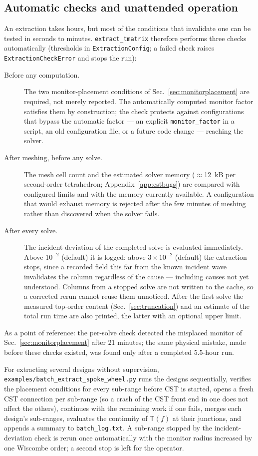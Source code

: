 \documentclass[11pt]{article}
\begin{document}
\subsection{Automatic checks and unattended operation}
\label{sec:rungates}
An extraction takes hours, but most of the conditions that invalidate
one can be tested in seconds to minutes.  \texttt{extract\_tmatrix}
therefore performs three checks automatically (thresholds in
\texttt{ExtractionConfig}; a failed check raises
\texttt{ExtractionCheckError} and stops the run):
\begin{description}
\item[Before any computation.]  The two monitor-placement conditions of
Sec.~\ref{sec:monitorplacement} are required, not merely reported.  The
automatically computed monitor factor satisfies them by construction;
the check protects against configurations that bypass the automatic
factor --- an explicit \texttt{monitor\_factor} in a script, an old
configuration file, or a future code change --- reaching the solver.
\item[After meshing, before any solve.]  The mesh cell count and the
estimated solver memory ($\approx$12~kB per second-order tetrahedron;
Appendix~\ref{app:cstbugs}) are compared with configured limits and
with the memory currently available.  A configuration that would
exhaust memory is rejected after the few minutes of meshing rather
than discovered when the solver fails.
\item[After every solve.]  The incident deviation of the completed
solve is evaluated immediately.  Above $10^{-2}$ (default) it is
logged; above $3\times10^{-2}$ (default) the extraction stops, since a
recorded field this far from the known incident wave invalidates the
column regardless of the cause --- including causes not yet
understood.  Columns from a stopped solve are not written to the
cache, so a corrected rerun cannot reuse them unnoticed.  After the
first solve the measured top-order content
(Sec.~\ref{sec:truncation}) and an estimate of the total run time are
also printed, the latter with an optional upper limit.
\end{description}
As a point of reference: the per-solve check detected the misplaced
monitor of Sec.~\ref{sec:monitorplacement} after 21 minutes; the same
physical mistake, made before these checks existed, was found only
after a completed 5.5-hour run.

For extracting several designs without supervision,
\texttt{examples/batch\_extract\_spoke\_wheel.py} runs the designs
sequentially, verifies the placement conditions for every sub-range
before CST is started, opens a fresh CST connection per sub-range (so
a crash of the CST front end in one does not affect the others),
continues with the remaining work if one fails, merges each design's
sub-ranges, evaluates the continuity of $\mathsf{T}(f)$ at their
junctions, and appends a summary to \texttt{batch\_log.txt}.  A
sub-range stopped by the incident-deviation check is rerun once
automatically with the monitor radius increased by one Wiscombe order;
a second stop is left for the operator.
\end{document}
